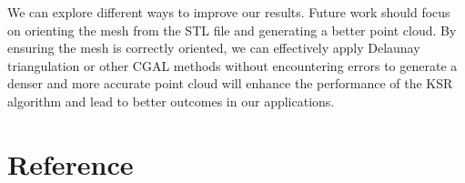 \documentclass{article}
\begin{document}
We can explore different ways to improve our results. Future work should focus on orienting the mesh from the STL file and generating a better point cloud. 
By ensuring the mesh is correctly oriented, we can effectively apply Delaunay triangulation or other CGAL methods without encountering errors to  generate a denser 
and more accurate point cloud will enhance the performance of the KSR algorithm and lead to better outcomes in our applications.

\nocite{*}
\section{Reference}


\end{document}
